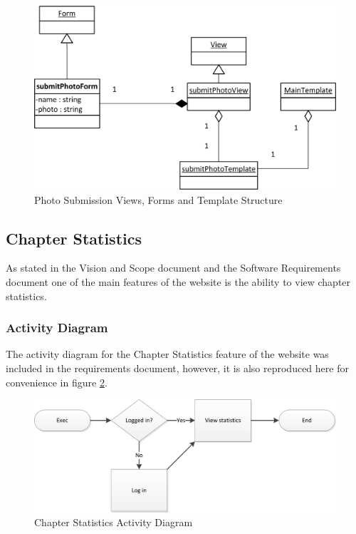 \documentclass{article}
\begin{document}
\FloatBarrier
\begin{figure}[h!]
\centering
\includegraphics[scale=.65]{img/viewFormTemplateDiagrams/submitPhoto}
\caption{Photo Submission Views, Forms and Template Structure}
\label{fig:photoViewFormTemplateDiagram}
\end{figure}
\FloatBarrier

\subsection{Chapter Statistics}

As stated in the Vision and Scope document and the Software Requirements document one of the main features of the website is the ability to view chapter statistics.

\subsubsection{Activity Diagram}
The activity diagram for the Chapter Statistics feature of the website was included in the requirements document, however, it is also reproduced here for convenience in figure \ref{fig:chapterStatisticsActivityDiagram}.

\FloatBarrier
\begin{figure}
\centering
\includegraphics[scale=.65]{img/activityDiagrams/chapterStatisticsActivity1}
\caption{Chapter Statistics Activity Diagram}
\label{fig:chapterStatisticsActivityDiagram}
\end{figure}
\FloatBarrier

\newpage


\end{document}
